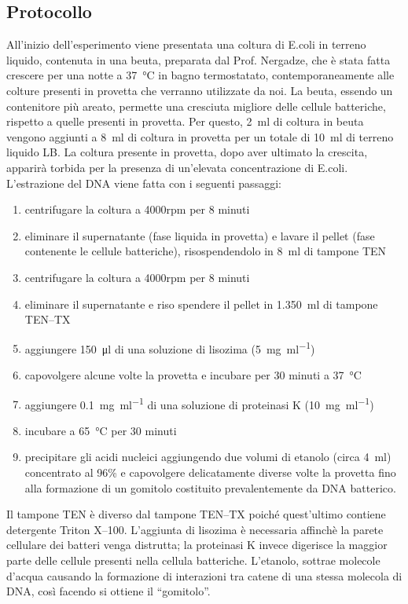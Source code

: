 \documentclass[twocolumn,a4paper,10pt]{my_report}
\begin{document}
\subsection{Protocollo}
All’inizio dell’esperimento viene presentata una coltura di E.coli in terreno liquido, contenuta in una beuta, preparata dal Prof. Nergadze, che è stata fatta crescere per una notte a \SI{37}{\celsius} in bagno termostatato, contemporaneamente alle colture presenti in provetta che verranno utilizzate da noi. La beuta, essendo un contenitore più areato, permette una cresciuta migliore delle cellule batteriche, rispetto a quelle presenti in provetta. Per questo, \SI{2}{\ml} di coltura in beuta vengono aggiunti a \SI{8}{\ml} di coltura in provetta per un totale di \SI{10}{\ml} di terreno liquido LB.
La coltura presente in provetta, dopo aver ultimato la crescita, apparirà torbida per la presenza di un’elevata concentrazione di E.coli. L’estrazione del DNA viene fatta con i seguenti passaggi:

\begin{enumerate}
    \item centrifugare la coltura a 4000rpm per 8 minuti
    \item eliminare il supernatante (fase liquida in provetta) e lavare il pellet (fase contenente le cellule batteriche), risospendendolo in \SI{8}{\ml} di tampone TEN
    \item centrifugare la coltura a 4000rpm per 8 minuti
    \item eliminare il supernatante e riso spendere il pellet in \SI{1.350}{\ml} di tampone TEN--TX
    \item aggiungere \SI{150}{\ul} di una soluzione di lisozima (\SI{5}{\mg\per\ml})
    \item capovolgere alcune volte la provetta e incubare per 30 minuti a \SI{37}{\celsius}
    \item aggiungere \SI{0.1}{\mg\per\ml} di una soluzione di proteinasi K (\SI{10}{\mg\per\ml})
    \item incubare a \SI{65}{\celsius} per 30 minuti
    \item precipitare gli acidi nucleici aggiungendo due volumi di etanolo (circa \SI{4}{\ml}) concentrato al 96\% e capovolgere delicatamente diverse volte la provetta fino alla formazione di un gomitolo costituito prevalentemente da DNA batterico.
\end{enumerate}

Il tampone TEN è diverso dal tampone TEN--TX poiché quest’ultimo contiene detergente Triton X--100.
L’aggiunta di lisozima è necessaria affinchè la parete cellulare dei batteri venga distrutta; la proteinasi K invece digerisce la maggior parte delle cellule presenti nella cellula batteriche.
L’etanolo, sottrae molecole d’acqua causando la formazione di interazioni tra catene di una stessa molecola di DNA, così facendo si ottiene il ``gomitolo''.
\end{document}
